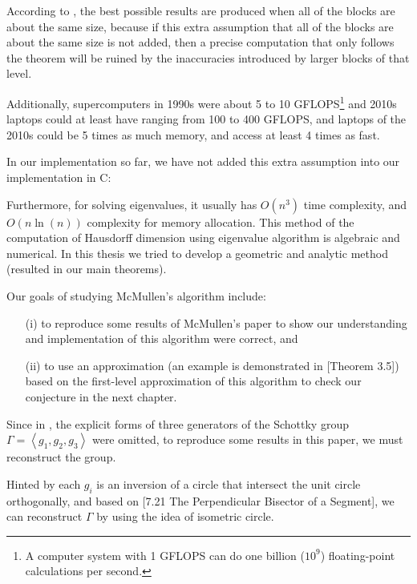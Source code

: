 \documentclass[12pt,oneside]{sfsuthesis}
\theoremstyle{plain} %
\theoremstyle{definition}  %
\theoremstyle{remark}  %
\theoremstyle{plain}
\begin{document}
{According to \cite{mcmullen1998hausdorff}, the best possible results are produced when all of the blocks are about the same size, because if this extra assumption that all of the blocks are about the same size is not added, then a precise computation that only follows the theorem will be ruined by the inaccuracies introduced by larger blocks of that level.

Additionally, supercomputers in 1990s were about 5 to 10 GFLOPS\footnote{A computer system with 1 GFLOPS can do one billion ($10^9$) floating-point calculations per second.} and 2010s laptops could at least have ranging from 100 to 400 GFLOPS, and laptops of the 2010s could be 5 times as much memory, and access at least 4 times as fast.  

In our implementation so far, we have not added this extra assumption into our implementation in C:

 

Furthermore, for solving eigenvalues, it usually has $O(n^3)$ time complexity, and $O(n\ln(n))$ complexity for memory allocation. This method of the computation of Hausdorff dimension using eigenvalue algorithm is algebraic and numerical. In this thesis we tried to develop a geometric and analytic method (resulted in our main theorems).

Our goals of studying McMullen's algorithm include:
\begin{enumerate}
\item[(i)] to reproduce some results of McMullen's paper\cite{mcmullen1998hausdorff} to show our understanding and implementation of this algorithm were correct, and
\item[(ii)] to use an approximation (an example is demonstrated in \cite{mcmullen1998hausdorff}[Theorem 3.5]) based on the first-level approximation of this algorithm to check our conjecture in the next chapter.
\end{enumerate}
  

Since in \cite{mcmullen1998hausdorff}, the explicit forms of three generators of the Schottky group $\Gamma=\left\langle g_1, g_2, g_3\right\rangle$ were omitted, to reproduce some results in this paper, we must reconstruct the group.

Hinted by each $g_i$ is an inversion of a circle that intersect the unit circle orthogonally, and based on \cite{beardon2012geometry}[7.21 The Perpendicular Bisector of a Segment], we can reconstruct $\Gamma$ by using the idea of isometric circle.

}
\end{document}
